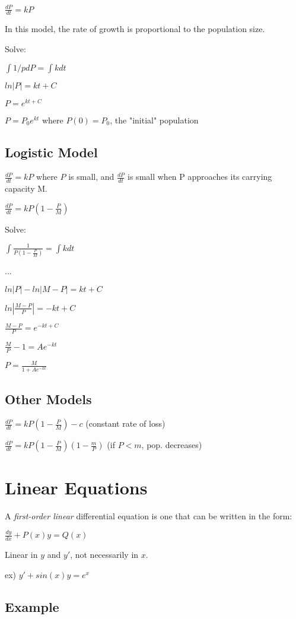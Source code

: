 \documentclass{article}
\begin{document}
$\frac{dP}{dt} = kP$

In this model, the rate of growth is proportional to the population size.
 
Solve: 

$\int 1/p dP = \int k dt$

$ln |P| = kt + C$

$P = e^{kt+C}$

$P = P_0e^{kt}$ where $P(0) = P_0$, the "initial" population

\subsection{Logistic Model}

$\frac{dP}{dt} = kP$ where $P$ is small, and $\frac{dP}{dt}$ is small when P approaches its carrying capacity M.

$\frac{dP}{dt} = kP(1-\frac{P}{M})$

Solve: 

$\int \frac{1}{P(1-\frac{P}{M})} = \int k dt$

...

$ln |P| - ln|M-P| = kt+C$

$ln|\frac{M-P}{P}| = -kt+C$

$\frac{M-P}{P} = e^{-kt+C}$

$\frac{M}{P} -1 = Ae^{-kt}$

$P = \frac{M}{1+Ae^{-kt}}$

\subsection{Other Models}

$\frac{dP}{dt} = kP(1-\frac{P}{M}) - c$ (constant rate of loss)

$\frac{dP}{dt} = kP(1-\frac{P}{M})(1-\frac{m}{P})$ (if $P<m$, pop. decreases)

\section{Linear Equations}

A \textit{first-order linear} differential equation is one that can be written in the form:

$\frac{dy}{dx} + P(x)y = Q(x)$

Linear in $y$ and $y'$, not necessarily in $x$.

ex) $y' + sin(x)y = e^x$

\subsection{Example}
\end{document}

